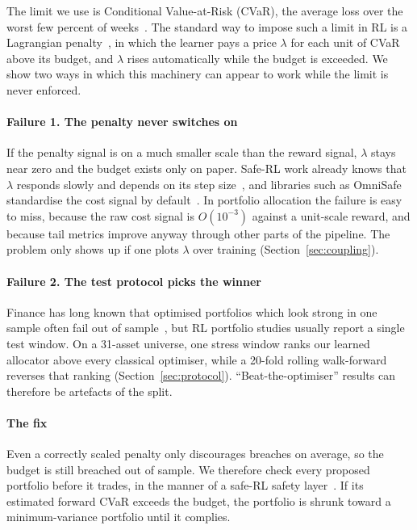 \documentclass[sigconf]{acmart}
\begin{document}
The limit we use is Conditional Value-at-Risk (CVaR), the average loss over the worst few
percent of weeks~\cite{rockafellar2000optimization}. The standard way to impose such a limit in
RL is a Lagrangian penalty~\cite{altman1999cmdp}, in which the learner pays a price $\lambda$ for each
unit of CVaR above its budget, and $\lambda$ rises automatically while the budget is
exceeded. We show two ways in which this machinery can appear to work while the limit is never
enforced.

\paragraph{Failure 1. The penalty never switches on} If the penalty signal is on a much smaller
scale than the reward signal, $\lambda$ stays near zero and the budget exists only on paper.
Safe-RL work already knows that $\lambda$ responds slowly and depends on its step
size~\cite{stooke2020pid}, and libraries such as OmniSafe standardise the cost signal by
default~\cite{ji2024omnisafe}. In portfolio allocation the failure is easy to miss, because
the raw cost signal is $O(10^{-3})$ against a unit-scale reward, and because tail metrics improve anyway through other parts of the pipeline. The problem only shows
up if one plots $\lambda$ over training (Section~\ref{sec:coupling}).

\paragraph{Failure 2. The test protocol picks the winner} Finance has long known that
optimised portfolios which look strong in one sample often fail out of
sample~\cite{demiguel2009optimal,bailey2014deflated}, but RL portfolio studies usually report a
single test window. On a 31-asset universe, one stress window ranks our learned allocator above
every classical optimiser, while a 20-fold rolling walk-forward reverses that ranking
(Section~\ref{sec:protocol}). ``Beat-the-optimiser'' results can therefore be artefacts of the
split.

\paragraph{The fix} Even a correctly scaled penalty only discourages breaches on average, so
the budget is still breached out of sample. We therefore check every proposed portfolio before
it trades, in the manner of a safe-RL safety layer~\cite{dalal2018safe}. If its estimated forward CVaR exceeds the budget, the portfolio is shrunk toward a minimum-variance portfolio
until it complies.
\end{document}
